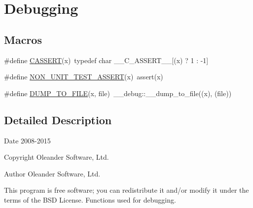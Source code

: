 \hypertarget{group___debugging}{\section{Debugging}
\label{group___debugging}
}
\subsection*{Macros}
\begin{DoxyCompactItemize}
\item 
\#define \hyperlink{group___debugging_gaef525f59da3110dc32652beae7944b5b}{C\-A\-S\-S\-E\-R\-T}(x)~typedef char \-\_\-\-\_\-\-C\-\_\-\-A\-S\-S\-E\-R\-T\-\_\-\-\_\-\mbox{[}(x) ? 1 \-: -\/1\mbox{]}
\item 
\#define \hyperlink{group___debugging_ga1f3720b71e9fee35a9907b2b8faabeda}{N\-O\-N\-\_\-\-U\-N\-I\-T\-\_\-\-T\-E\-S\-T\-\_\-\-A\-S\-S\-E\-R\-T}(x)~assert(x)
\item 
\#define \hyperlink{group___debugging_ga84e7646de26c8c5086ba7ec530dfd4d9}{D\-U\-M\-P\-\_\-\-T\-O\-\_\-\-F\-I\-L\-E}(x, file)~\-\_\-\-\_\-debug\-::\-\_\-\-\_\-dump\-\_\-to\-\_\-file((x), (file))
\end{DoxyCompactItemize}


\subsection{Detailed Description}
\begin{DoxyDate}{Date}
2008-\/2015 
\end{DoxyDate}
\begin{DoxyCopyright}{Copyright}
Oleander Software, Ltd. 
\end{DoxyCopyright}
\begin{DoxyAuthor}{Author}
Oleander Software, Ltd.
\end{DoxyAuthor}
This program is free software; you can redistribute it and/or modify it under the terms of the B\-S\-D License. Functions used for debugging. 

